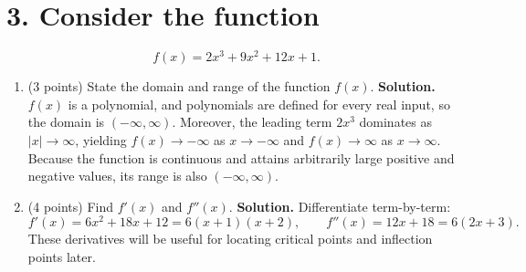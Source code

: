 \documentclass[12pt]{article}
\begin{document}
\newpage

\section*{3. Consider the function}
\[ f(x) = 2x^3 + 9x^2 + 12x + 1. \]

\begin{enumerate}[label=(\alph*)]
    \item (3 points) State the domain and range of the function $f(x)$.
    {\color{blue}\textbf{Solution.} $f(x)$ is a polynomial, and polynomials are defined for every real input, so the domain is $(-\infty,\infty)$. Moreover, the leading term $2x^3$ dominates as $|x|\to\infty$, yielding $f(x)\to -\infty$ as $x\to -\infty$ and $f(x)\to \infty$ as $x\to \infty$. Because the function is continuous and attains arbitrarily large positive and negative values, its range is also $(-\infty,\infty)$.}

    \item (4 points) Find $f'(x)$ and $f''(x)$.
    {\color{blue}\textbf{Solution.} Differentiate term-by-term:
    \[
        f'(x)=6x^2+18x+12=6(x+1)(x+2),\qquad f''(x)=12x+18=6(2x+3).
    \]
    These derivatives will be useful for locating critical points and inflection points later.}
    
\end{enumerate}

\newpage
\end{document}
